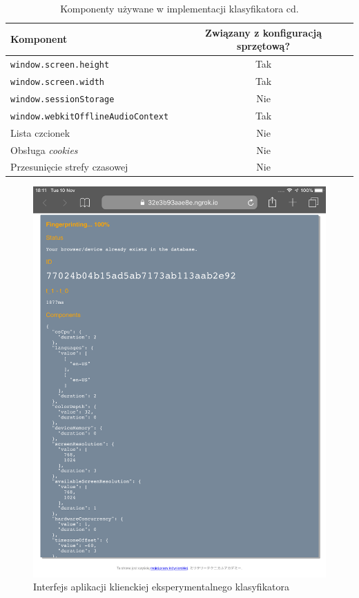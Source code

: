 \begin{table}
	\centering
	\caption{Komponenty używane w implementacji klasyfikatora cd.}
	\begin{tabular}{|l|c|}
		\hline
		Komponent                                 & Związany z konfiguracją sprzętową? \\
		\hline
		\texttt{window.screen.height}             & Tak                                    \\
		\texttt{window.screen.width}              & Tak                                    \\
		\texttt{window.sessionStorage}            & Nie                                    \\
		\texttt{window.webkitOfflineAudioContext} & Tak                                    \\
		Lista czcionek                            & Nie                                    \\
		Obsługa \emph{cookies}                   & Nie                                    \\
		Przesunięcie strefy czasowej             & Nie                                    \\
		\hline
	\end{tabular}
\end{table}

\begin{figure}
	\includegraphics[width=\textwidth,keepaspectratio]{img/10}
	\caption{Interfejs aplikacji klienckiej eksperymentalnego klasyfikatora}
\end{figure}
